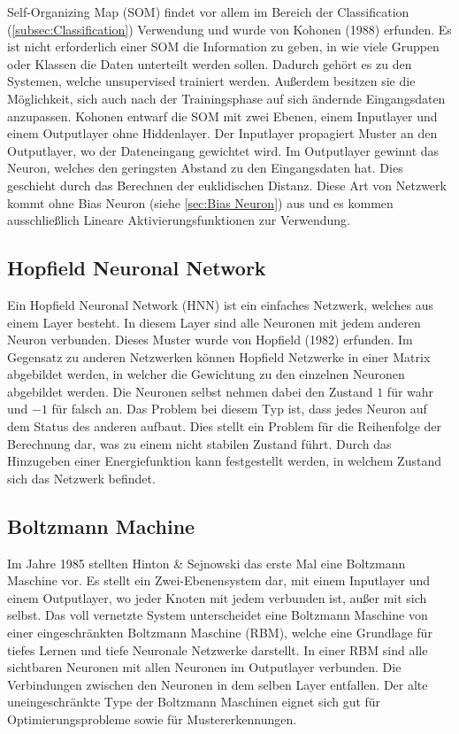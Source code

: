 Self-Organizing Map (SOM) findet vor allem im Bereich der Classification (\ref{subsec:Classification}) Verwendung und wurde von Kohonen (1988) erfunden. 
Es ist nicht erforderlich einer SOM die Information zu geben, in wie viele Gruppen oder Klassen die Daten unterteilt werden sollen. 
Dadurch gehört es zu den Systemen, welche unsupervised trainiert werden. 
Außerdem besitzen sie die Möglichkeit, sich auch nach der Trainingsphase auf sich ändernde Eingangsdaten anzupassen. 
Kohonen entwarf die SOM mit zwei Ebenen, einem Inputlayer und einem Outputlayer ohne Hiddenlayer. 
Der Inputlayer propagiert Muster an den Outputlayer, wo der Dateneingang gewichtet wird. 
Im Outputlayer gewinnt das Neuron, welches den geringsten Abstand zu den Eingangsdaten hat.
Dies geschieht durch das Berechnen der euklidischen Distanz. 
Diese Art von Netzwerk kommt ohne Bias Neuron (siehe \ref{sec:Bias Neuron}) aus und es kommen ausschließlich Lineare Aktivierungsfunktionen zur Verwendung.


\subsection{Hopfield Neuronal Network}

Ein Hopfield Neuronal Network (HNN) ist ein einfaches Netzwerk, welches aus einem Layer besteht. 
In diesem Layer sind alle Neuronen mit jedem anderen Neuron verbunden. 
Dieses Muster wurde von Hopfield (1982) erfunden. 
Im Gegensatz zu anderen Netzwerken können Hopfield Netzwerke in einer Matrix abgebildet werden, in welcher die Gewichtung zu den einzelnen Neuronen abgebildet werden. 
Die Neuronen selbst nehmen dabei den Zustand $1$ für wahr und $-1$ für falsch an.
Das Problem bei diesem Typ ist, dass jedes Neuron auf dem Status des anderen aufbaut.
Dies stellt ein Problem für die Reihenfolge der Berechnung dar, was zu einem nicht stabilen Zustand führt.
Durch das Hinzugeben einer Energiefunktion kann festgestellt werden, in welchem Zustand sich das Netzwerk befindet.

\subsection{Boltzmann Machine}

Im Jahre 1985 stellten Hinton \& Sejnowski das erste Mal eine Boltzmann Maschine vor.
Es stellt ein Zwei-Ebenensystem dar, mit einem Inputlayer und einem Outputlayer, wo jeder Knoten mit jedem verbunden ist, außer mit sich selbst.
Das voll vernetzte System unterscheidet eine Boltzmann Maschine von einer eingeschränkten Boltzmann Maschine (RBM), welche eine Grundlage für tiefes Lernen und tiefe Neuronale Netzwerke darstellt.
In einer RBM sind alle sichtbaren Neuronen mit allen Neuronen im Outputlayer verbunden. 
Die Verbindungen zwischen den Neuronen in dem selben Layer entfallen.
Der alte uneingeschränkte Type der Boltzmann Maschinen eignet sich gut für Optimierungsprobleme sowie für Mustererkennungen.

